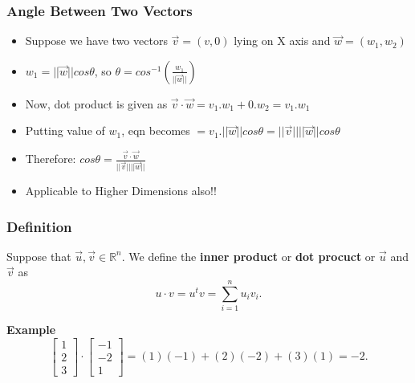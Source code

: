  \begin{frame}[fragile] \frametitle{Angle Between Two Vectors}

 \begin{itemize}
 
\item Suppose we have two vectors $\vec{v} = (v, 0)$ lying on X axis and $\vec{w}= (w_1,w_2)$
\item $w_1 = ||\vec{w}||cos\theta$, so $\theta = cos^{-1}(\frac{w_1}{||\vec{w}||})$
\item Now, dot product is given as $\vec{v}\cdot\vec{w} = v_1.w_1 + 0.w_2 = v_1.w_1$
\item Putting value of $w_1$, eqn becomes $= v_1.||\vec{w}||cos\theta = ||\vec{v}||||\vec{w}||cos\theta$
\item Therefore: $cos\theta = \frac{\vec{v}\cdot\vec{w}}{||\vec{v}||||\vec{w}||}$
\item Applicable to Higher Dimensions also!!
\end{itemize}
 
\end{frame}

\begin{frame}[fragile] \frametitle{Definition}

Suppose that $\vec{u}, \vec{v}\in \mathbb R^n$.  We define the
 \textbf{inner product} or \textbf{dot procuct} or $\vec{u}$ and $\vec{v}$ as
 $$
 u\cdot v = u^tv=\sum_{i=1}^n u_i v_i.
 $$


\textbf{Example}
$$
 \left[ \begin{array}{r} 1\\2\\3 \end{array}\right] \cdot   \left[\begin{array}{r} -1\\-2\\1 \end{array}\right] =
 (1)(-1) + (2)(-2) + (3)(1) = -2.
 $$

\end{frame}


 

